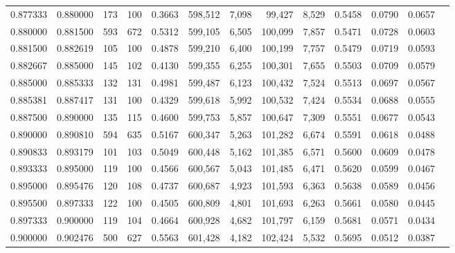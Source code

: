 \begin{tabular}{rrrrrrrrrrrrr}
0.877333 & 0.880000 &   173 & 100 &                                     0.3663 & 598,512 &   7,098 &  99,427 &   8,529 & 0.5458 & 0.0790 & 0.0657 \\
0.880000 & 0.881500 &   593 & 672 &                                     0.5312 & 599,105 &   6,505 & 100,099 &   7,857 & 0.5471 & 0.0728 & 0.0603 \\
0.881500 & 0.882619 &   105 & 100 &                                     0.4878 & 599,210 &   6,400 & 100,199 &   7,757 & 0.5479 & 0.0719 & 0.0593 \\
0.882667 & 0.885000 &   145 & 102 &                                     0.4130 & 599,355 &   6,255 & 100,301 &   7,655 & 0.5503 & 0.0709 & 0.0579 \\
0.885000 & 0.885333 &   132 & 131 &                                     0.4981 & 599,487 &   6,123 & 100,432 &   7,524 & 0.5513 & 0.0697 & 0.0567 \\
0.885381 & 0.887417 &   131 & 100 &                                     0.4329 & 599,618 &   5,992 & 100,532 &   7,424 & 0.5534 & 0.0688 & 0.0555 \\
0.887500 & 0.890000 &   135 & 115 &                                     0.4600 & 599,753 &   5,857 & 100,647 &   7,309 & 0.5551 & 0.0677 & 0.0543 \\
0.890000 & 0.890810 &   594 & 635 &                                     0.5167 & 600,347 &   5,263 & 101,282 &   6,674 & 0.5591 & 0.0618 & 0.0488 \\
0.890833 & 0.893179 &   101 & 103 &                                     0.5049 & 600,448 &   5,162 & 101,385 &   6,571 & 0.5600 & 0.0609 & 0.0478 \\
0.893333 & 0.895000 &   119 & 100 &                                     0.4566 & 600,567 &   5,043 & 101,485 &   6,471 & 0.5620 & 0.0599 & 0.0467 \\
0.895000 & 0.895476 &   120 & 108 &                                     0.4737 & 600,687 &   4,923 & 101,593 &   6,363 & 0.5638 & 0.0589 & 0.0456 \\
0.895500 & 0.897333 &   122 & 100 &                                     0.4505 & 600,809 &   4,801 & 101,693 &   6,263 & 0.5661 & 0.0580 & 0.0445 \\
0.897333 & 0.900000 &   119 & 104 &                                     0.4664 & 600,928 &   4,682 & 101,797 &   6,159 & 0.5681 & 0.0571 & 0.0434 \\
0.900000 & 0.902476 &   500 & 627 &                                     0.5563 & 601,428 &   4,182 & 102,424 &   5,532 & 0.5695 & 0.0512 & 0.0387 \\

\end{tabular}
